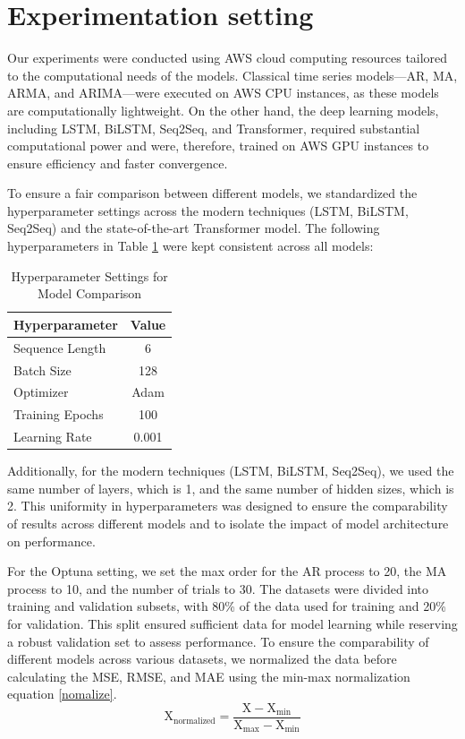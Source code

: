 \documentclass{scrartcl}
\begin{document}
\section{Experimentation setting}
Our experiments were conducted using AWS cloud computing resources tailored to the computational needs of the models. Classical time series models—AR, MA, ARMA, and ARIMA—were executed on AWS CPU instances, as these models are computationally lightweight. On the other hand, the deep learning models, including LSTM, BiLSTM, Seq2Seq, and Transformer, required substantial computational power and were, therefore, trained on AWS GPU instances to ensure efficiency and faster convergence. 

To ensure a fair comparison between different models, we standardized the hyperparameter settings across the modern techniques (LSTM, BiLSTM, Seq2Seq) and the state-of-the-art Transformer model. The following hyperparameters in Table \ref{tab:hyperparams} were kept consistent across all models:

\begin{table}[h]
\centering
\begin{tabular}{lc}
\hline
\textbf{Hyperparameter}         & \textbf{Value} \\ \hline
Sequence Length                 & 6              \\ 
Batch Size                      & 128            \\ 
Optimizer                       & Adam           \\ 
Training Epochs       & 100            \\ 
Learning Rate                   & 0.001          \\ \hline
\end{tabular}
\caption{Hyperparameter Settings for Model Comparison}
\label{tab:hyperparams}
\end{table}

Additionally, for the modern techniques (LSTM, BiLSTM, Seq2Seq), we used the same number of layers, which is 1, and the same number of hidden sizes, which is 2. This uniformity in hyperparameters was designed to ensure the comparability of results across different models and to isolate the impact of model architecture on performance.

For the Optuna setting, we set the max order for the AR process to 20, the MA process to 10, and the number of trials to 30. The datasets were divided into training and validation subsets, with 80\% of the data used for training and 20\% for validation. This split ensured sufficient data for model learning while reserving a robust validation set to assess performance. To ensure the comparability of different models across various datasets, we normalized the data before calculating the MSE, RMSE, and MAE using the min-max normalization equation \ref{nomalize}.
\begin{equation}
\text{X}_{\text{normalized}} = \frac{\text{X} - \text{X}_{\min}}{\text{X}_{\max} - \text{X}_{\min}}
\label{nomalize}
\end{equation}
\end{document}
